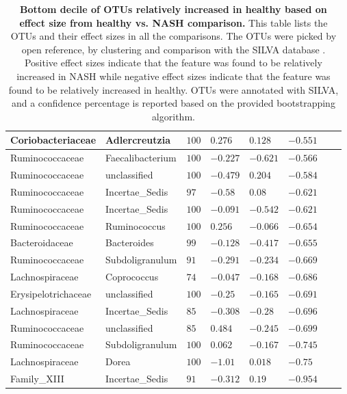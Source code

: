 \begin{table}[!ht]
\begin{tiny}
\begin{tabular}{|l|l|l|l|l|l|l|l|}
Coriobacteriaceae & Adlercreutzia & $100$ & $0.276$ & $0.128$ & $-0.551$ \\ \hline
Ruminococcaceae & Faecalibacterium & $100$ & $-0.227$ & $-0.621$ & $-0.566$ \\ \hline
Ruminococcaceae & unclassified & $100$ & $-0.479$ & $0.204$ & $-0.584$ \\ \hline
Ruminococcaceae & Incertae_Sedis & $97$ & $-0.58$ & $0.08$ & $-0.621$ \\ \hline
Ruminococcaceae & Incertae_Sedis & $100$ & $-0.091$ & $-0.542$ & $-0.621$ \\ \hline
Ruminococcaceae & Ruminococcus & $100$ & $0.256$ & $-0.066$ & $-0.654$ \\ \hline
Bacteroidaceae & Bacteroides & $99$ & $-0.128$ & $-0.417$ & $-0.655$ \\ \hline
Ruminococcaceae & Subdoligranulum & $91$ & $-0.291$ & $-0.234$ & $-0.669$ \\ \hline
Lachnospiraceae & Coprococcus & $74$ & $-0.047$ & $-0.168$ & $-0.686$ \\ \hline
Erysipelotrichaceae & unclassified & $100$ & $-0.25$ & $-0.165$ & $-0.691$ \\ \hline
Lachnospiraceae & Incertae_Sedis & $85$ & $-0.308$ & $-0.28$ & $-0.696$ \\ \hline
Ruminococcaceae & unclassified & $85$ & $0.484$ & $-0.245$ & $-0.699$ \\ \hline
Ruminococcaceae & Subdoligranulum & $100$ & $0.062$ & $-0.167$ & $-0.745$ \\ \hline
Lachnospiraceae & Dorea & $100$ & $-1.01$ & $0.018$ & $-0.75$ \\ \hline
Family_XIII & Incertae_Sedis & $91$ & $-0.312$ & $0.19$ & $-0.954$ \\ \hline
\end{tabular}
\end{tiny}
\caption[Bottom decile of OTUs relatively increased in healthy based on effect size from healthy vs. NASH comparison.]{ \textbf{Bottom decile of OTUs relatively increased in healthy based on effect size from healthy vs. NASH comparison.} This table lists the OTUs and their effect sizes in all the comparisons. The OTUs were picked by open reference, by clustering and comparison with the SILVA database \cite{quast2013silva}. Positive effect sizes indicate that the feature was found to be relatively increased in NASH while negative effect sizes indicate that the feature was found to be relatively increased in healthy. OTUs were annotated with SILVA, and a confidence percentage is reported based on the provided bootstrapping algorithm.}
\label{nafld_bot_otu_table}
\end{table}


